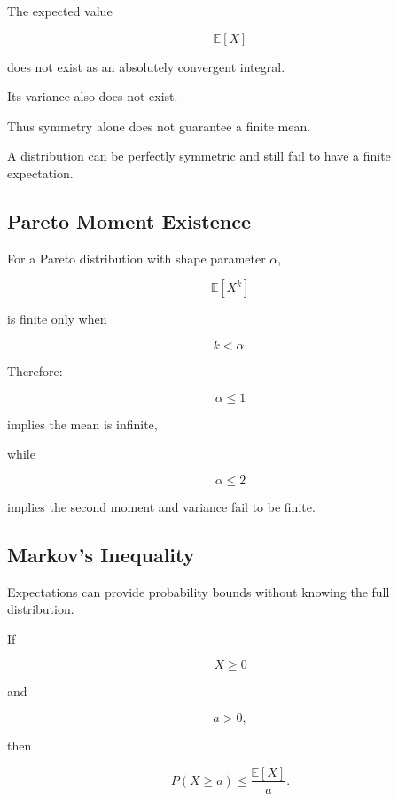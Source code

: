 The expected value

\[
\mathbb{E}[X]
\]

does not exist as an absolutely convergent integral.

Its variance also does not exist.

Thus symmetry alone does not guarantee a finite mean.

\begin{warningbox}
A distribution can be perfectly symmetric and still fail to have a
finite expectation.
\end{warningbox}

\subsection{Pareto Moment Existence}
\label{subsec:pareto-moment-existence}

For a Pareto distribution with shape parameter \(\alpha\),

\[
\mathbb{E}[X^k]
\]

is finite only when

\[
\boxed{
k<\alpha.
}
\]

Therefore:

\[
\alpha\leq1
\]

implies the mean is infinite,

while

\[
\alpha\leq2
\]

implies the second moment and variance fail to be finite.

\subsection{Markov's Inequality}
\label{subsec:markov-inequality}

Expectations can provide probability bounds without knowing the full
distribution.

\begin{theorem}
If

\[
X\geq0
\]

and

\[
a>0,
\]

then

\[
\boxed{
P(X\geq a)
\leq
\frac{
\mathbb{E}[X]
}{a}.
}
\]
\end{theorem}


